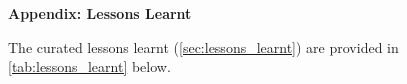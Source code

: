 %

\clearpage
\begin{landscape}
\pagestyle{empty}
\setlength{\textwidth}{\textheight}
\setlength{\linewidth}{\textwidth}

{}
{\large\bfseries\color{ercblue} Appendix: Lessons Learnt}

\bigskip
\noindent The curated lessons learnt (\autoref{sec:lessons_learnt}) are
provided in \autoref{tab:lessons_learnt} below.



\end{landscape}
\pagestyle{fancy}
\clearpage
